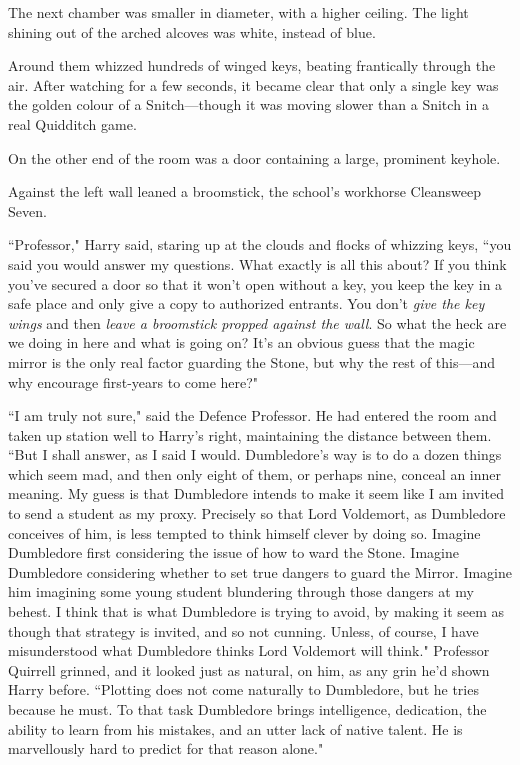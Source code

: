\later

The next chamber was smaller in diameter, with a higher ceiling. The light shining out of the arched alcoves was white, instead of blue.

Around them whizzed hundreds of winged keys, beating frantically through the air. After watching for a few seconds, it became clear that only a single key was the golden colour of a Snitch—though it was moving slower than a Snitch in a real Quidditch game.

On the other end of the room was a door containing a large, prominent keyhole.

Against the left wall leaned a broomstick, the school's workhorse Cleansweep Seven.

``Professor," Harry said, staring up at the clouds and flocks of whizzing keys, ``you said you would answer my questions. What exactly is all this about? If you think you've secured a door so that it won't open without a key, you keep the key in a safe place and only give a copy to authorized entrants. You don't \emph{give the key wings} and then \emph{leave a broomstick propped against the wall}. So what the heck are we doing in here and what is going on? It's an obvious guess that the magic mirror is the only real factor guarding the Stone, but why the rest of this—and why encourage first-years to come here?"

``I am truly not sure," said the Defence Professor. He had entered the room and taken up station well to Harry's right, maintaining the distance between them. ``But I shall answer, as I said I would. Dumbledore's way is to do a dozen things which seem mad, and then only eight of them, or perhaps nine, conceal an inner meaning. My guess is that Dumbledore intends to make it seem like I am invited to send a student as my proxy. Precisely so that Lord Voldemort, as Dumbledore conceives of him, is less tempted to think himself clever by doing so. Imagine Dumbledore first considering the issue of how to ward the Stone. Imagine Dumbledore considering whether to set true dangers to guard the Mirror. Imagine him imagining some young student blundering through those dangers at my behest. I think that is what Dumbledore is trying to avoid, by making it seem as though that strategy is invited, and so not cunning. Unless, of course, I have misunderstood what Dumbledore thinks Lord Voldemort will think." Professor Quirrell grinned, and it looked just as natural, on him, as any grin he'd shown Harry before. ``Plotting does not come naturally to Dumbledore, but he tries because he must. To that task Dumbledore brings intelligence, dedication, the ability to learn from his mistakes, and an utter lack of native talent. He is marvellously hard to predict for that reason alone."

